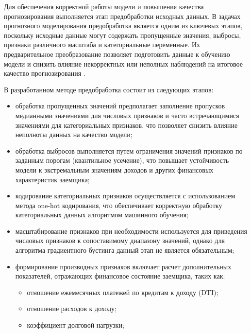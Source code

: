Для обеспечения корректной работы модели и повышения качества прогнозирования выполняется этап предобработки исходных данных. В задачах прогнозного моделирования предобработка является одним из ключевых этапов, поскольку исходные данные могут содержать пропущенные значения, выбросы, признаки различного масштаба и категориальные переменные. Их предварительное преобразование позволяет подготовить данные к обучению модели и снизить влияние некорректных или неполных наблюдений на итоговое качество прогнозирования \cite{KuhnPreprocessing}.

В разработанном методе предобработка состоит из следующих этапов:

\begin{itemize}
  \item обработка пропущенных значений предполагает заполнение пропусков медианными значениями для числовых признаков и часто встречающимися значениями для категориальных признаков, что позволяет снизить влияние неполноты данных на качество модели;

  \item обработка выбросов выполняется путем ограничения значений признаков по заданным порогам (квантильное усечение), что повышает устойчивость модели к экстремальным значениям доходов и других финансовых характеристик заемщика;

  \item кодирование категориальных признаков осуществляется с использованием метода one-hot кодирования, что обеспечивает корректную обработку категориальных данных алгоритмом машинного обучения;

  \item масштабирование признаков при необходимости используется для приведения числовых признаков к сопоставимому диапазону значений, однако для алгоритма градиентного бустинга данный этап не является обязательным;

  \item формирование производных признаков включает расчет дополнительных показателей, отражающих финансовое состояние заемщика, таких как:
        \begin{itemize}
          \item отношение ежемесячных платежей по кредитам к доходу (DTI);
          \item отношение расходов к доходу;
          \item коэффициент долговой нагрузки;
        \end{itemize}
\end{itemize}

